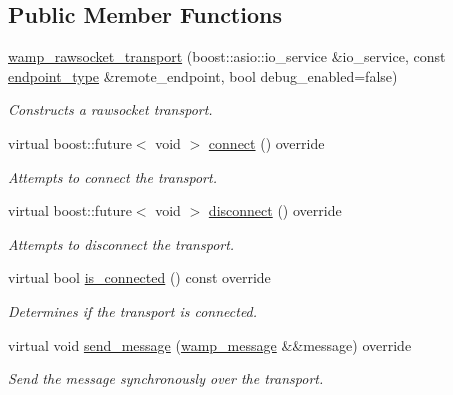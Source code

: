 \subsection*{Public Member Functions}
\begin{DoxyCompactItemize}
\item 
\hyperlink{classautobahn_1_1wamp__rawsocket__transport_a304576feebe5400ac00acb9deb330318}{wamp\+\_\+rawsocket\+\_\+transport} (boost\+::asio\+::io\+\_\+service \&io\+\_\+service, const \hyperlink{classautobahn_1_1wamp__rawsocket__transport_ae262d9ecdd93daae0e44b5b557bf24e8}{endpoint\+\_\+type} \&remote\+\_\+endpoint, bool debug\+\_\+enabled=false)
\begin{DoxyCompactList}\small\item\em Constructs a rawsocket transport. \end{DoxyCompactList}\item 
virtual boost\+::future$<$ void $>$ \hyperlink{classautobahn_1_1wamp__rawsocket__transport_a2555c344ee08add2598e8aa90d809a9e}{connect} () override
\begin{DoxyCompactList}\small\item\em Attempts to connect the transport. \end{DoxyCompactList}\item 
virtual boost\+::future$<$ void $>$ \hyperlink{classautobahn_1_1wamp__rawsocket__transport_a7ae409074a0b522e3b1db87e417117bc}{disconnect} () override
\begin{DoxyCompactList}\small\item\em Attempts to disconnect the transport. \end{DoxyCompactList}\item 
virtual bool \hyperlink{classautobahn_1_1wamp__rawsocket__transport_ad987b3a015db76afa9fb35ecf1ef671d}{is\+\_\+connected} () const override
\begin{DoxyCompactList}\small\item\em Determines if the transport is connected. \end{DoxyCompactList}\item 
virtual void \hyperlink{classautobahn_1_1wamp__rawsocket__transport_a50479854025d275eb16c4e2cdcd8ca12}{send\+\_\+message} (\hyperlink{classautobahn_1_1wamp__message}{wamp\+\_\+message} \&\&message) override
\begin{DoxyCompactList}\small\item\em Send the message synchronously over the transport. \end{DoxyCompactList}\item 

\end{DoxyCompactItemize}

